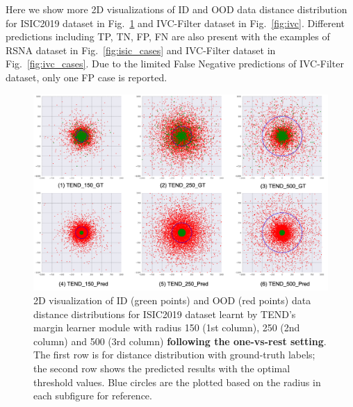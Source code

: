 \documentclass[12pt]{spieman}  %
\begin{document}
\begin{spacing}{2}
Here we show more 2D visualizations of ID and OOD data distance distribution for ISIC2019 dataset in Fig.~\ref{fig:isic} and  IVC-Filter dataset in Fig.~\ref{fig:ivc}. Different predictions including TP, TN, FP, FN are also present with the examples of RSNA dataset in Fig.~\ref{fig:isic_cases} and IVC-Filter dataset in Fig.~\ref{fig:ivc_cases}. Due to the limited False Negative predictions of IVC-Filter dataset, only one FP case is reported.
\begin{figure}[htp]
\begin{center}
  \includegraphics[width=\linewidth]{fig5.png}
\end{center}
  \caption{2D visualization of ID (green points) and OOD (red points) data distance distributions for ISIC2019 dataset learnt by TEND's margin learner module with radius 150 (1st column), 250 (2nd column) and 500 (3rd column) \textbf{following the one-vs-rest setting}. The first row is for distance distribution with ground-truth labels; the second row shows the predicted results with the optimal threshold values. Blue circles are the plotted based on the radius in each subfigure for reference.} 
\label{fig:isic}
\end{figure} 


\end{spacing}
\end{document}
